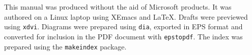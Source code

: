 \pagestyle{plain}

\rule{0pt}{17em}

\begin{center}
\begin{minipage}{0.6\textwidth}
\noindent
This manual was produced without the aid of Microsoft products.
It was authored on a Linux laptop using XEmacs and
\LaTeX{}.  Drafts were previewed using
\texttt{xdvi}. Diagrams were prepared using \texttt{dia}, exported
in EPS format and converted for inclusion in the PDF document with \texttt{epstopdf}.  
The index was prepared using the \texttt{makeindex} package.
\end{minipage}
\end{center}

